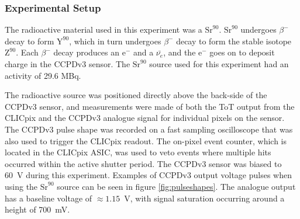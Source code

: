 
\subsubsection{Experimental Setup}
The radioactive material used in this experiment was a $\text{Sr}^{90}$.  $\text{Sr}^{90}$ undergoes $\beta^{-}$ decay to form $\text{Y}^{90}$, which in turn undergoes $\beta^{-}$ decay to form the stable isotope $\text{Z}^{90}$.  Each $\beta^{-}$ decay produces an $\text{e}^{-}$ and a $\bar{\nu_{e}}$, and the $\text{e}^{-}$ goes on to deposit charge in the CCPDv3 sensor.  The $\text{Sr}^{90}$ source used for this experiment had an activity of 29.6 MBq.  

The radioactive source was positioned directly above the back-side of the CCPDv3 sensor, and measurements were made of both the ToT output from the CLICpix and the CCPDv3 analogue signal for individual pixels on the sensor.  The CCPDv3 pulse shape was recorded on a fast sampling oscilloscope that was also used to trigger the CLICpix readout.  The on-pixel event counter, which is located in the CLICpix ASIC, was used to veto events where multiple hits occurred within the active shutter period.  The CCPDv3 sensor was biased to 60~V during this experiment.  Examples of CCPDv3 output voltage pulses when using the $\text{Sr}^{90}$ source can be seen in figure \ref{fig:pulseshapes}.  The analogue output has a baseline voltage of $\approx 1.15$~V, with signal saturation occurring around a height of 700~mV.  

